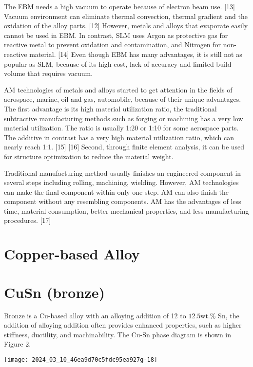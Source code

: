 \documentclass[10pt]{article}
\begin{document}
The EBM needs a high vacuum to operate because of electron beam use. [13] Vacuum environment can eliminate thermal convection, thermal gradient and the oxidation of the alloy parts. [12] However, metals and alloys that evaporate easily cannot be used in EBM. In contrast, SLM uses Argon as protective gas for reactive metal to prevent oxidation and contamination, and Nitrogen for non-reactive material. [14] Even though EBM has many advantages, it is still not as popular as SLM, because of its high cost, lack of accuracy and limited build volume that requires vacuum.

AM technologies of metals and alloys started to get attention in the fields of aerospace, marine, oil and gas, automobile, because of their unique advantages. The first advantage is its high material utilization ratio, the traditional subtractive manufacturing methods such as forging or machining has a very low material utilization. The ratio is usually 1:20 or 1:10 for some aerospace parts. The additive in contrast has a very high material utilization ratio, which can nearly reach 1:1. [15] [16] Second, through finite element analysis, it can be used for structure optimization to reduce the material weight.

Traditional manufacturing method usually finishes an engineered component in several steps including rolling, machining, wielding. However, AM technologies can make the final component within only one step. AM can also finish the component without any resembling components. AM has the advantages of less time, material consumption, better mechanical properties, and less manufacturing procedures. [17]

\section*{Copper-based Alloy}
\section*{CuSn (bronze)}
Bronze is a Cu-based alloy with an alloying addition of 12 to $12.5 \mathrm{wt} . \%$ Sn, the addition of alloying addition often provides enhanced properties, such as higher stiffness, ductility, and machinability. The Cu-Sn phase diagram is shown in Figure 2.

\begin{center}
\texttt{[image: 2024\_03\_10\_46ea9d70c5fdc95ea927g-18]}
\end{center}
\end{document}
